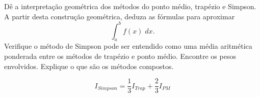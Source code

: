 %   

\begin{exer}
 Dê a interpretação geométrica dos métodos do ponto médio, trapézio e Simpson. A partir desta construção geométrica, deduza as fórmulas para aproximar 
 $$\int_a^bf(x)\;dx.$$
 Verifique o método de Simpson pode ser entendido como uma média aritmética ponderada entre os métodos de trapézio e ponto médio. Encontre os pesos envolvidos. Explique o que são os métodos compostos.
 \end{exer}
\begin{resp}
  
$$ I_{Simpson}= \frac{1}{3} I_{Trap}+ \frac{2}{3}I_{PM}$$    
  
\end{resp}


